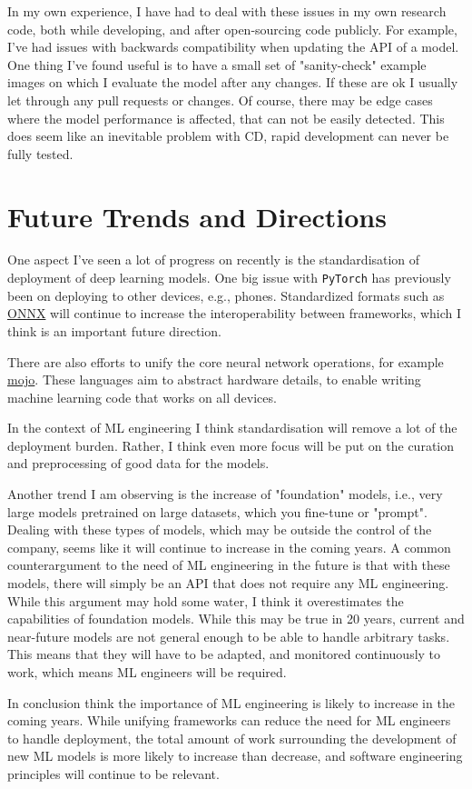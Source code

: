 \documentclass[11pt]{article}
\begin{document}
In my own experience, I have had to deal with these issues in my own research code, both while developing, and after open-sourcing code publicly. For example, I've had issues with backwards compatibility when updating the API of a model. One thing I've found useful is to have a small set of "sanity-check" example images on which I evaluate the model after any changes. If these are ok I usually let through any pull requests or changes. Of course, there may be edge cases where the model performance is affected, that can not be easily detected. This does seem like an inevitable problem with CD, rapid development can never be fully tested.

\section{Future Trends and Directions}
One aspect I've seen a lot of progress on recently is the standardisation of deployment of deep learning models. One big issue with \texttt{PyTorch} has previously been on deploying to other devices, e.g., phones. Standardized formats such as 
\href{https://onnx.ai/}{ONNX} will continue to increase the interoperability between frameworks, which I think is an important future direction. 

There are also efforts to unify the core neural network operations, for example \href{https://www.modular.com/mojo}{mojo}. These languages aim to abstract hardware details, to enable writing machine learning code that works on all devices. 

In the context of ML engineering I think standardisation will remove a lot of the deployment burden. Rather, I think even more focus will be put on the curation and preprocessing of good data for the models.

Another trend I am observing is the increase of "foundation" models, i.e., very large models pretrained on large datasets, which you fine-tune or "prompt". Dealing with these types of models, which may be outside the control of the company, seems like it will continue to increase in the coming years. A common counterargument to the need of ML engineering in the future is that with these models, there will simply be an API that does not require any ML engineering. While this argument may hold some water, I think it overestimates the capabilities of foundation models. While this may be true in 20 years, current and near-future models are not general enough to be able to handle arbitrary tasks. This means that they will have to be adapted, and monitored continuously to work, which means ML engineers will be required.

In conclusion think the importance of ML engineering is likely to increase in the coming years. While unifying frameworks can reduce the need for ML engineers to handle deployment, the total amount of work surrounding the development of new ML models is more likely to increase than decrease, and software engineering principles will continue to be relevant. 

{
    \small
    
    
}
\end{document}
